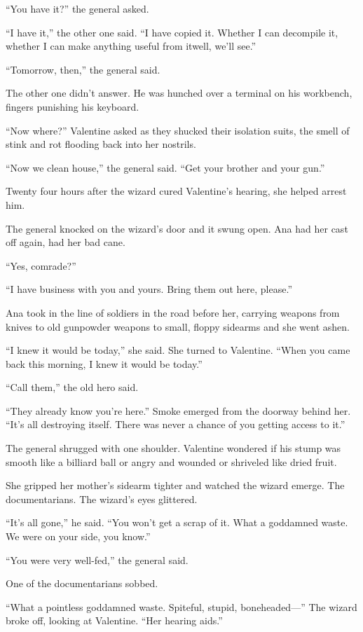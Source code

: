 “You have it?” the general asked.

“I have it,” the other one said. “I have copied it. Whether I can
decompile it, whether I can make anything useful from it\dash{}well,
we’ll see.”

“Tomorrow, then,” the general said.

The other one didn’t answer. He was hunched over a terminal on his
workbench, fingers punishing his keyboard.

“Now where?” Valentine asked as they shucked their isolation suits,
the smell of stink and rot flooding back into her nostrils.

“Now we clean house,” the general said. “Get your brother and your
gun.”

\tb

Twenty four hours after the wizard cured Valentine’s hearing, she
helped arrest him.

The general knocked on the wizard’s door and it swung open. Ana had
her cast off again, had her bad cane.

“Yes, comrade?”

“I have business with you and yours. Bring them out here, please.”

Ana took in the line of soldiers in the road before her, carrying
weapons from knives to old gunpowder weapons to small, floppy
sidearms and she went ashen.

“I knew it would be today,” she said. She turned to Valentine.
“When you came back this morning, I knew it would be today.”

“Call them,” the old hero said.

“They already know you’re here.” Smoke emerged from the doorway
behind her. “It’s all destroying itself. There was never a chance
of you getting access to it.”

The general shrugged with one shoulder. Valentine wondered if his
stump was smooth like a billiard ball or angry and wounded or
shriveled like dried fruit.

She gripped her mother’s sidearm tighter and watched the wizard
emerge. The documentarians. The wizard’s eyes glittered.

“It’s all gone,” he said. “You won’t get a scrap of it. What a
goddamned waste. We were on your side, you know.”

“You were very well-fed,” the general said.

One of the documentarians sobbed.

“What a pointless goddamned waste. Spiteful, stupid, bone\-headed---”
The wizard broke off, looking at Valentine. “Her hearing aids.”

